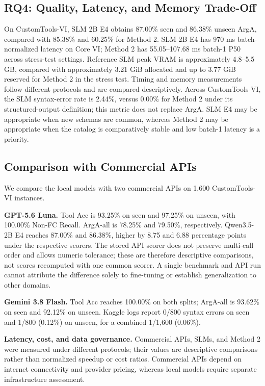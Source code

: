 \documentclass[10pt,twocolumn,a4paper]{article}
\begin{document}
\subsection{RQ4: Quality, Latency, and Memory Trade-Off}
On CustomTools-VI, SLM 2B E4 obtains 87.00\% seen and 86.38\% unseen ArgA, compared with 85.38\% and 60.25\% for Method 2. SLM 2B E4 has 970 ms batch-normalized latency on Core VI; Method 2 has 55.05--107.68 ms batch-1 P50 across stress-test settings. Reference SLM peak VRAM is approximately 4.8--5.5 GB, compared with approximately 3.21 GiB allocated and up to 3.77 GiB reserved for Method 2 in the stress test. Timing and memory measurements follow different protocols and are compared descriptively. Across CustomTools-VI, the SLM syntax-error rate is 2.44\%, versus 0.00\% for Method 2 under its structured-output definition; this metric does not replace ArgA. SLM E4 may be appropriate when new schemas are common, whereas Method 2 may be appropriate when the catalog is comparatively stable and low batch-1 latency is a priority.

\subsection{Comparison with Commercial APIs}
We compare the local models with two commercial APIs on 1,600 CustomTools-VI instances.

\textbf{GPT-5.6 Luna.} Tool Acc is 93.25\% on seen and 97.25\% on unseen, with 100.00\% Non-FC Recall. ArgA-all is 78.25\% and 79.50\%, respectively. Qwen3.5-2B E4 reaches 87.00\% and 86.38\%, higher by 8.75 and 6.88 percentage points under the respective scorers. The stored API scorer does not preserve multi-call order and allows numeric tolerance; these are therefore descriptive comparisons, not scores recomputed with one common scorer. A single benchmark and API run cannot attribute the difference solely to fine-tuning or establish generalization to other domains.

\textbf{Gemini 3.8 Flash.} Tool Acc reaches 100.00\% on both splits; ArgA-all is 93.62\% on seen and 92.12\% on unseen. Kaggle logs report 0/800 syntax errors on seen and 1/800 (0.12\%) on unseen, for a combined 1/1,600 (0.06\%).

\textbf{Latency, cost, and data governance.} Commercial APIs, SLMs, and Method 2 were measured under different protocols; their values are descriptive comparisons rather than normalized speedup or cost ratios. Commercial APIs depend on internet connectivity and provider pricing, whereas local models require separate infrastructure assessment.
\end{document}
